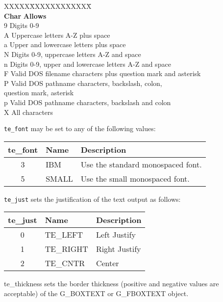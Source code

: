 \begin{description}
\begin{description}
\begin{tabbing}
XXXXX\=XXXXXXXXXXXX\=\kill\\
{\bf Char} \> {\bf  Allows}\\
9 \> Digits 0-9\\
A \> Uppercase letters A-Z plus space\\
a \> Upper and lowercase letters plus space\\
N \> Digits 0-9, uppercase letters A-Z and space\\
n \> Digits 0-9, upper and lowercase letters A-Z  and space\\
F \> Valid DOS filename characters plus question mark and asterisk \\
P \> Valid DOS pathname characters, backslash, colon, \\
  \> question mark, asterisk \\
p \> Valid DOS pathname characters, backslash and colon\\
X \> All characters\\
\end{tabbing}

\verb|te_font| may be set to any of the following values:

\begin{center}
\begin{tabular}{|cll|}
\hline
{\bf te\_font} &{\bf  Name} & {\bf Description} \\
\hline
3 &IBM    & Use the standard monospaced font.\\
5 &SMALL  &  Use the small monospaced font.\\
\hline
\end{tabular}
\end{center}

\verb|te_just| sets the justification of the text output as follows:

\begin{center}
\begin{tabular}{|cll|}
\hline
{\bf te\_just} &{\bf  Name} & {\bf Description} \\
\hline
0 & TE\_LEFT & Left Justify\\
1 & TE\_RIGHT & Right Justify\\
2 & TE\_CNTR & Center\\
\hline
\end{tabular}
\end{center}


te\_thickness sets the border thickness (positive and negative values
are acceptable) of the G\_BOXTEXT or G\_FBOXTEXT object. 


\end{description}
\end{description}
